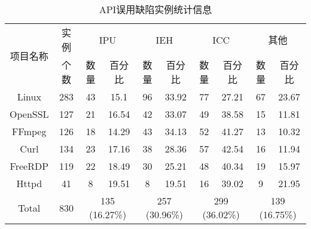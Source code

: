\begin{table}[t]
	\centering
	\begin{minipage}[t]{\linewidth} %
		\caption{API误用缺陷实例统计信息}
		\label{tab:2-3-root-causes}
		\begin{tabular}{cccccccccc}
			\hline
			\multirow{2}{*}{项目名称} & 实例 & \multicolumn{2}{c}{IPU}& \multicolumn{2}{c}{IEH}& \multicolumn{2}{c}{ICC}& \multicolumn{2}{c}{其他}\\
			\cline{3-10}
			& 个数 & 数量 & 百分比 & 数量& 百分比 & 数量& 百分比& 数量& 百分比 \\
			\hline
			Linux  & 283 & 43 & 15.1 & {96} & {33.92} & 77 & 27.21 & 67 & 23.67 \\
			OpenSSL  & 127 & 21 & 16.54 & 42 & 33.07 & {49} & {38.58} & 15 & 11.81 \\ 
			FFmpeg  & 126  &  18 & 14.29 & 43 & 34.13 & 52 & 41.27 & 13 & 10.32 \\
			Curl  & 134   & 23 & 17.16 & 38 & 28.36 & 57 & 42.54 & 16 & 11.94 \\ 
			FreeRDP   & 119 & 22 & 18.49 & 30 & 25.21 & 48 & 40.34 & 19 & 15.97 \\ 
			Httpd  & 41 & 8 & 19.51 & 8 & 19.51 & 16 & 39.02 & 9 & 21.95 \\ 
			\hline
			Total  & 830 & \multicolumn{2}{c}{135 (16.27\%)} & \multicolumn{2}{c}{257 (30.96\%)} & \multicolumn{2}{c}{299 (36.02\%)} & \multicolumn{2}{c}{139 (16.75\%)}\\ 
			\hline
		\end{tabular}
	\end{minipage}
\end{table}